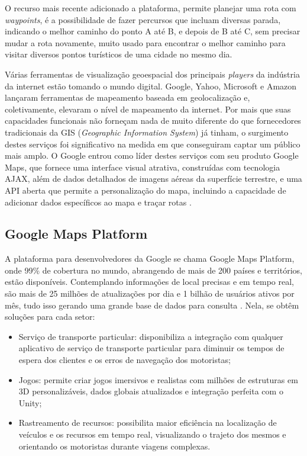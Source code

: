 O recurso mais recente adicionado a plataforma, permite planejar uma rota com \textit{waypoints}, é a possibilidade de fazer percursos que incluam diversas parada, indicando o melhor caminho do ponto A até B, e depois de B até C, sem precisar mudar a rota novamente, muito usado para encontrar o melhor caminho para visitar diversos pontos turísticos de uma cidade no mesmo dia.

Várias ferramentas de visualização geoespacial dos principais \textit{players} da indústria da internet estão tomando o mundo digital. Google, Yahoo, Microsoft e Amazon lançaram ferramentas de mapeamento baseada em geolocalização e, coletivamente, elevaram o nível de mapeamento da internet. Por mais que suas capacidades funcionais não forneçam nada de muito diferente do que fornecedores tradicionais da GIS (\textit{Geographic Information System}) já tinham, o surgimento destes serviços foi significativo na medida em que conseguiram captar um público mais amplo. O Google entrou como líder destes serviços com seu produto Google Maps, que fornece uma interface visual atrativa, construídas com tecnologia AJAX, além de dados detalhados de imagens aéreas da superfície terrestre, e uma API aberta que permite a personalização do mapa, incluindo a capacidade de adicionar dados específicos ao mapa e traçar rotas \cite{geospatial:2009}.

\subsection{Google Maps Platform}
A plataforma para desenvolvedores da Google se chama Google Maps Platform, onde 99\%
de cobertura no mundo, abrangendo de mais de 200 países e territórios, estão disponíveis. Contemplando informações de local precisas e em tempo real, são mais de 25 milhões de atualizações por dia e 1 bilhão de usuários ativos por mês, tudo isso gerando uma grande base de dados para consulta \cite{google:2019}. Nela, se obtêm soluções para cada setor:
\begin{itemize}
    \item Serviço de transporte particular: disponibiliza a integração com qualquer aplicativo de serviço de transporte particular para diminuir os tempos de espera dos clientes e os erros de navegação dos motoristas;
    \item Jogos: permite criar jogos imersivos e realistas com milhões de estruturas em 3D personalizáveis, dados globais atualizados e integração perfeita com o Unity;
    \item Rastreamento de recursos: possibilita maior eficiência na localização de veículos e os recursos em tempo real, visualizando o trajeto dos mesmos e orientando os motoristas durante viagens complexas. 
\end{itemize}

